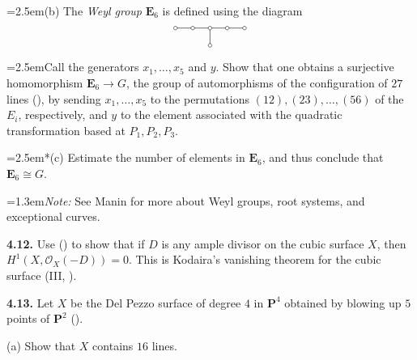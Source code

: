 {\noindent\hangindent=2.5em\hspace*{1.25em}(b) The \emph{Weyl group} $\mathbf E_6$ is defined using the diagram
\[
\begin{tikzpicture}[x=.54cm,y=.54cm]
\draw (0,0)--(4,0) (2,0)--(2,-1);
\foreach \x in {0,1,2,3,4} \draw[fill=white] (\x,0) circle[radius=1.6pt];
\draw[fill=white] (2,-1) circle[radius=1.6pt];
\end{tikzpicture}
\]
\noindent\hangindent=2.5em\hspace*{2.5em}Call the generators $x_1,\dots,x_5$ and $y$. Show that one obtains a surjective homomorphism $\mathbf E_6\to G$, the group of automorphisms of the configuration of $27$ lines (), by sending $x_1,\dots,x_5$ to the permutations $(12),(23),\dots,(56)$ of the $E_i$, respectively, and $y$ to the element associated with the quadratic transformation based at $P_1,P_2,P_3$.

\noindent\hangindent=2.5em\hspace*{.95em}*(c) Estimate the number of elements in $\mathbf E_6$, and thus conclude that $\mathbf E_6\cong G$.

\noindent\hangindent=1.3em\hspace*{1.3em}\emph{Note:} See Manin  for more about Weyl groups, root systems, and exceptional curves.

\smallskip
\noindent\hypertarget{ex-V-4.12}{}\textbf{4.12.} Use () to show that if $D$ is any ample divisor on the cubic surface $X$, then $H^1(X,\mathcal O_X(-D))=0$. This is Kodaira's vanishing theorem for the cubic surface (III, ).

\smallskip
\noindent\hypertarget{ex-V-4.13}{}\textbf{4.13.} Let $X$ be the Del Pezzo surface of degree $4$ in $\mathbf P^4$ obtained by blowing up $5$ points of $\mathbf P^2$ ().

\noindent\hspace*{1.3em}(a) Show that $X$ contains $16$ lines.}
